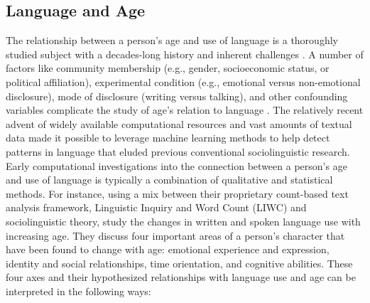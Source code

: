 \subsection{Language and Age}\label{subsec:background_lang_age}
The relationship between a person's age and use of language is a thoroughly studied subject with a decades-long history and inherent challenges \citep{pennebaker2003words, nguyen2014gender, zheng2019personalized}. A number of factors like community membership (e.g., gender, socioeconomic status, or political affiliation), experimental condition (e.g., emotional versus non-emotional disclosure), mode of disclosure (writing versus talking), and other confounding variables complicate the study of age's relation to language \citep{nguyen-etal-2011-author}. The relatively recent advent of widely available computational resources and vast amounts of textual data made it possible to leverage machine learning methods to help detect patterns in language that eluded previous conventional sociolinguistic research. Early computational investigations into the connection between a person's age and use of language is typically a combination of qualitative and statistical methods. For instance, using a mix between their proprietary count-based text analysis framework, Linguistic Inquiry and Word Count (LIWC) and sociolinguistic theory, \cite{pennebaker2003words} study the changes in written and spoken language use with increasing age. They discuss four important areas of a person's character that have been found to change with age: emotional experience and expression, identity and social relationships, time orientation, and cognitive abilities. These four axes and their hypothesized relationships with language use and age can be interpreted in the following ways:
